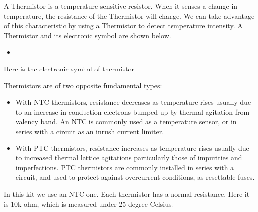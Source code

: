 \documentclass[a4paper,11pt,english]{sphinxmanual}
\let\sphinxpxdimen\pdfpxdimen\else\newdimen\sphinxpxdimen
\begin{document}
\sphinxAtStartPar
A Thermistor is a temperature sensitive resistor. When it senses a change in temperature, the resistance of the Thermistor will change. We can take advantage of this characteristic by using a Thermistor to detect temperature intensity. A Thermistor and its electronic symbol are shown below.
\begin{itemize}
\item {} 
\sphinxAtStartPar
{}

\end{itemize}

\sphinxAtStartPar
Here is the electronic symbol of thermistor.

\noindent{\hspace*{\fill}\sphinxincludegraphics[width=300\sphinxpxdimen]{{thermistor_symbol}.png}\hspace*{\fill}}

\sphinxAtStartPar
Thermistors are of two opposite fundamental types:
\begin{itemize}
\item {} 
\sphinxAtStartPar
With NTC thermistors, resistance decreases as temperature rises usually due to an increase in conduction electrons bumped up by thermal agitation from valency band. An NTC is commonly used as a temperature sensor, or in series with a circuit as an inrush current limiter.

\item {} 
\sphinxAtStartPar
With PTC thermistors, resistance increases as temperature rises usually due to increased thermal lattice agitations particularly those of impurities and imperfections. PTC thermistors are commonly installed in series with a circuit, and used to protect against overcurrent conditions, as resettable fuses.

\end{itemize}

\sphinxAtStartPar
In this kit we use an NTC one. Each thermistor has a normal resistance. Here it is 10k ohm, which is measured under 25 degree Celsius.
\end{document}
